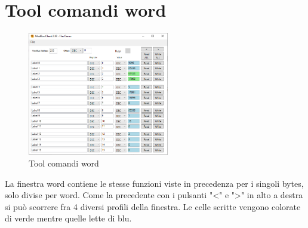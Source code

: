 \section{Tool comandi word}

\begin{figure}[H]
\centering
\includegraphics[width=0.55\textwidth]{../Img/Tool_Command_Word.PNG}
\caption{Tool comandi word}
\end{figure}

La finestra word contiene le stesse funzioni viste in precedenza per i singoli bytes, solo
divise per word. Come la precedente con i pulsanti "<" e ">" in alto a destra si può
scorrere fra 4 diversi profili della finestra.
Le celle scritte vengono colorate di verde mentre quelle lette di blu.
